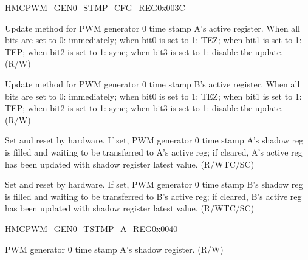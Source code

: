 \begin{register}{H}{MCPWM\_GEN0\_STMP\_CFG\_REG}{0x{}003C}\label{regdesc:MCPWMGEN0STMPCFGREG}
%
%
%
%
%
\regnewline%
\begin{regdesc}\begin{reglist}
\label{fielddesc:MCPWMGEN0AUPMETHOD}\item [MCPWM\_GEN0\_A\_UPMETHOD] Update method for PWM generator 0 time stamp A's active register. When all bits are set to 0: immediately; when bit0 is set to 1: TEZ; when bit1 is set to 1: TEP; when bit2 is set to 1: sync; when bit3 is set to 1: disable the update. (R/W)
\label{fielddesc:MCPWMGEN0BUPMETHOD}\item [MCPWM\_GEN0\_B\_UPMETHOD] Update method for PWM generator 0 time stamp B's active register. When all bits are set to 0: immediately; when bit0 is set to 1: TEZ; when bit1 is set to 1: TEP; when bit2 is set to 1: sync; when bit3 is set to 1: disable the update. (R/W)
\label{fielddesc:MCPWMGEN0ASHDWFULL}\item [MCPWM\_GEN0\_A\_SHDW\_FULL] Set and reset by hardware. If set, PWM generator 0 time stamp A's shadow reg is filled and waiting to be transferred to A's active reg; if cleared, A's active reg has been updated with shadow register latest value. (R/WTC/SC)
\label{fielddesc:MCPWMGEN0BSHDWFULL}\item [MCPWM\_GEN0\_B\_SHDW\_FULL] Set and reset by hardware. If set, PWM generator 0 time stamp B's shadow reg is filled and waiting to be transferred to B's active reg; if cleared, B's active reg has been updated with shadow register latest value. (R/WTC/SC)
\end{reglist}\end{regdesc}
\end{register}


\begin{register}{H}{MCPWM\_GEN0\_TSTMP\_A\_REG}{0x{}0040}\label{regdesc:MCPWMGEN0TSTMPAREG}
%
%
\regnewline%
\begin{regdesc}\begin{reglist}
\label{fielddesc:MCPWMGEN0A}\item [MCPWM\_GEN0\_A] PWM generator 0 time stamp A's shadow register. (R/W)
\end{reglist}\end{regdesc}
\end{register}



